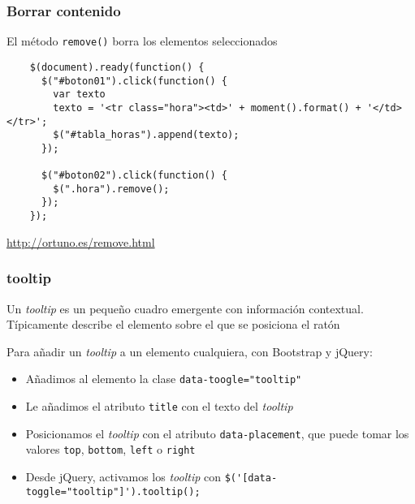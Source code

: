 \documentclass[ucs]{beamer}
\begin{document}
\begin{frame}[fragile]
\frametitle{Borrar contenido}
El método \verb|remove()| borra los elementos seleccionados

  \begin{scriptsize}
  \begin{verbatim}
    $(document).ready(function() {
      $("#boton01").click(function() {
        var texto
        texto = '<tr class="hora"><td>' + moment().format() + '</td></tr>';
        $("#tabla_horas").append(texto);
      });

      $("#boton02").click(function() {
        $(".hora").remove();
      });
    });
  \end{verbatim}
  \end{scriptsize}
\begin{tiny}
\begin{flushright}
\url{http://ortuno.es/remove.html}
\end{flushright}
\end{tiny}
\end{frame}

\begin{frame}[fragile]
\frametitle{tooltip}
Un \emph{tooltip} es un pequeño cuadro emergente con información contextual. Típicamente
describe el elemento sobre el que se posiciona el ratón

Para añadir un 
\emph{tooltip}
a un elemento cualquiera, con Bootstrap y jQuery:

    \begin{itemize}
    \item
Añadimos al elemento la clase
\verb|data-toogle="tooltip"|

    \item
Le añadimos el atributo \verb|title| con el texto del 
\emph{tooltip}

    \item
Posicionamos el 
\emph{tooltip}
con el atributo
\verb|data-placement|, que puede tomar los valores
\verb|top|,
\verb|bottom|,
\verb|left| o
\verb|right| 

    \item
Desde jQuery, activamos los 
\emph{tooltip}
con
\verb|$('[data-toggle="tooltip"]').tooltip();|
    \end{itemize}

\end{frame}
\end{document}
